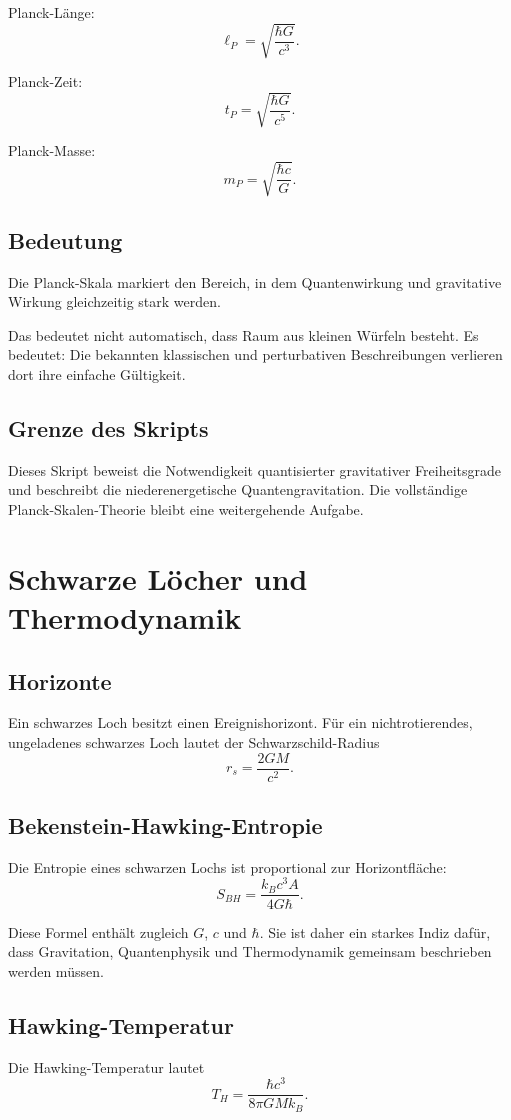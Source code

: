 \documentclass[11pt,a4paper,oneside]{book}
\theoremstyle{definition}
\theoremstyle{plain}
\theoremstyle{remark}
\begin{document}
Planck-Länge:
\[
\ell_P=\sqrt{\frac{\hbar G}{c^3}}.
\]

Planck-Zeit:
\[
t_P=\sqrt{\frac{\hbar G}{c^5}}.
\]

Planck-Masse:
\[
m_P=\sqrt{\frac{\hbar c}{G}}.
\]

\section{Bedeutung}
Die Planck-Skala markiert den Bereich, in dem Quantenwirkung und gravitative Wirkung gleichzeitig stark werden.

Das bedeutet nicht automatisch, dass Raum aus kleinen Würfeln besteht. Es bedeutet: Die bekannten klassischen und perturbativen Beschreibungen verlieren dort ihre einfache Gültigkeit.

\section{Grenze des Skripts}
Dieses Skript beweist die Notwendigkeit quantisierter gravitativer Freiheitsgrade und beschreibt die niederenergetische Quantengravitation. Die vollständige Planck-Skalen-Theorie bleibt eine weitergehende Aufgabe.

\chapter{Schwarze Löcher und Thermodynamik}
\section{Horizonte}
Ein schwarzes Loch besitzt einen Ereignishorizont. Für ein nichtrotierendes, ungeladenes schwarzes Loch lautet der Schwarzschild-Radius
\[
r_s=\frac{2GM}{c^2}.
\]

\section{Bekenstein-Hawking-Entropie}
Die Entropie eines schwarzen Lochs ist proportional zur Horizontfläche:
\[
S_{BH}=\frac{k_B c^3 A}{4G\hbar}.
\]

Diese Formel enthält zugleich $G$, $c$ und $\hbar$. Sie ist daher ein starkes Indiz dafür, dass Gravitation, Quantenphysik und Thermodynamik gemeinsam beschrieben werden müssen.

\section{Hawking-Temperatur}
Die Hawking-Temperatur lautet
\[
T_H=\frac{\hbar c^3}{8\pi G M k_B}.
\]
\end{document}
